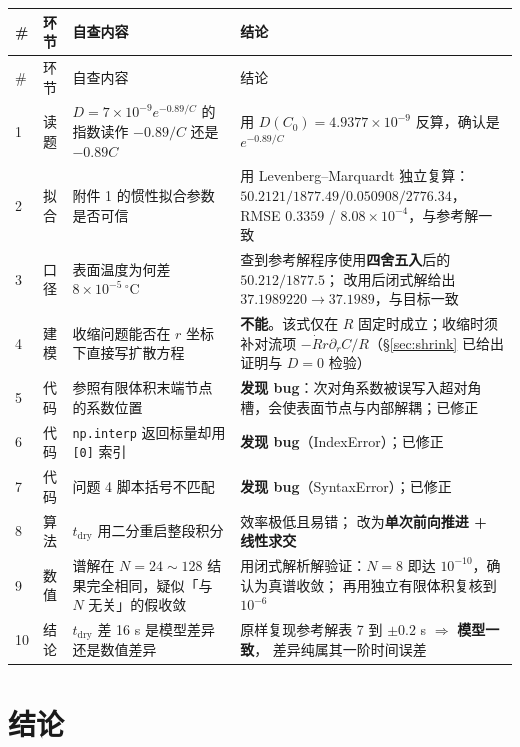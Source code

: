 \documentclass[11pt,a4paper]{article}
\theoremstyle{definition}
\begin{document}
\begin{center}
\small
\begin{longtable}{@{}p{0.6cm}p{1.6cm}p{6.0cm}p{6.4cm}@{}}
\toprule
\# & 环节 & 自查内容 & 结论 \\
\midrule
\endfirsthead
\toprule
\# & 环节 & 自查内容 & 结论 \\
\midrule
\endhead
1 & 读题 & $D=7\times10^{-9}e^{-0.89/C}$ 的指数读作 $-0.89/C$ 还是 $-0.89C$ &
用 $D(C_0)=4.9377\times10^{-9}$ 反算，确认是 $e^{-0.89/C}$ \\
2 & 拟合 & 附件 1 的惯性拟合参数是否可信 &
用 Levenberg--Marquardt 独立复算：$50.2121/1877.49/0.050908/2776.34$，
RMSE $0.3359$ / $8.08\times10^{-4}$，与参考解一致 \\
3 & 口径 & 表面温度为何差 $8\times10^{-5}\,^\circ$C &
查到参考解程序使用\textbf{四舍五入}后的 $50.212/1877.5$；
改用后闭式解给出 $37.1989220\to37.1989$，与目标一致 \\
4 & 建模 & 收缩问题能否在 $r$ 坐标下直接写扩散方程 &
\textbf{不能}。该式仅在 $R$ 固定时成立；收缩时须补对流项
$-\dot Rr\partial_rC/R$（\S\ref{sec:shrink} 已给出证明与 $D=0$ 检验）\\
5 & 代码 & 参照有限体积末端节点的系数位置 &
\textbf{发现 bug}：次对角系数被误写入超对角槽，会使表面节点与内部解耦；已修正 \\
6 & 代码 & \texttt{np.interp} 返回标量却用 \texttt{[0]} 索引 & \textbf{发现 bug}（IndexError）；已修正 \\
7 & 代码 & 问题 4 脚本括号不匹配 & \textbf{发现 bug}（SyntaxError）；已修正 \\
8 & 算法 & $t_{\text{dry}}$ 用二分重启整段积分 & 效率极低且易错；
改为\textbf{单次前向推进 + 线性求交} \\
9 & 数值 & 谱解在 $N=24\sim128$ 结果完全相同，疑似「与 $N$ 无关」的假收敛 &
用闭式解析解验证：$N=8$ 即达 $10^{-10}$，确认为真谱收敛；
再用独立有限体积复核到 $10^{-6}$ \\
10 & 结论 & $t_{\text{dry}}$ 差 16 s 是模型差异还是数值差异 &
原样复现参考解表 7 到 $\pm0.2$ s $\Rightarrow$ \textbf{模型一致}，
差异纯属其一阶时间误差 \\
\bottomrule
\end{longtable}
\end{center}

\section{结论}
\end{document}
